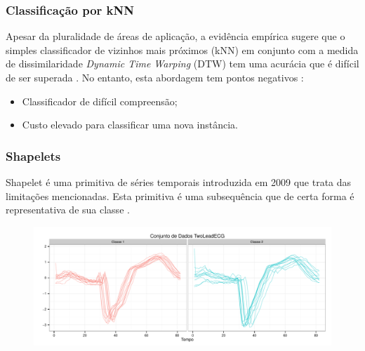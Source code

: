 \documentclass{beamer}
\begin{document}
\begin{frame}
\frametitle{Classifica{\c c}{\~a}o por kNN}

Apesar da pluralidade de {\'a}reas de aplica{\c c}{\~a}o, a evid{\^e}ncia emp{\'i}rica sugere que o simples classificador de vizinhos mais pr{\'o}ximos (kNN) em conjunto com a medida de dissimilaridade \textit{Dynamic Time Warping} (DTW) tem uma acur{\'a}cia que {\'e} dif{\'i}cil de ser superada \cite{Batista:2013by}. No entanto, esta abordagem tem pontos negativos \cite{Ye:2009do}:

\begin{itemize}
\item Classificador de dif{\'i}cil compreens{\~a}o;
\item Custo elevado para classificar uma nova inst{\^a}ncia.
\end{itemize}
\end{frame}


\begin{frame}
\frametitle{Shapelets}

Shapelet {\'e} uma primitiva de s{\'e}ries temporais introduzida em 2009 que trata das limita{\c c}{\~o}es mencionadas. Esta primitiva {\'e} uma subsequ{\^e}ncia que de certa forma {\'e} representativa de sua classe \cite{Ye:2009do}.

\begin{figure}
\includegraphics[width=1.0\linewidth]{images/shapelet-exemplo.pdf}
\end{figure}
\end{frame}

\end{document}
